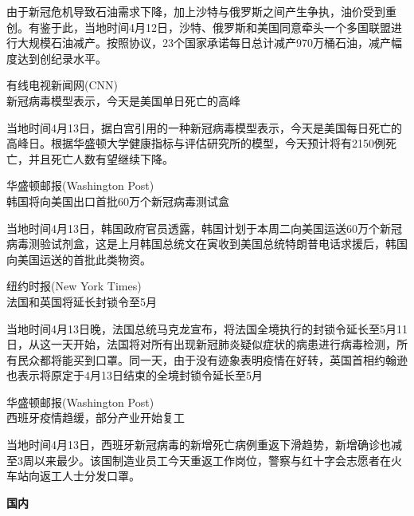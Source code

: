 \documentclass[]{article}
\begin{document}
由于新冠危机导致石油需求下降，加上沙特与俄罗斯之间产生争执，油价受到重创。有鉴于此，当地时间4月12日，沙特、俄罗斯和美国同意牵头一个多国联盟进行大规模石油减产。按照协议，23个国家承诺每日总计减产970万桶石油，减产幅度达到创纪录水平。

\begin{center}
\textcolor{glaucous}{有线电视新闻网(CNN)}\\新冠病毒模型表示，今天是美国单日死亡的高峰
\end{center}

当地时间4月13日，据白宫引用的一种新冠病毒模型表示，今天是美国每日死亡的高峰日。根据华盛顿大学健康指标与评估研究所的模型，今天预计将有2150例死亡，并且死亡人数有望继续下降。

\begin{center}
\textcolor{glaucous}{华盛顿邮报(Washington Post)}\\韩国将向美国出口首批60万个新冠病毒测试盒
\end{center}

当地时间4月13日，韩国政府官员透露，韩国计划于本周二向美国运送60万个新冠病毒测验试剂盒，这是上月韩国总统文在寅收到美国总统特朗普电话求援后，韩国向美国运送的首批此类物资。

\begin{center}
\textcolor{glaucous}{纽约时报(New York Times)}\\法国和英国将延长封锁令至5月
\end{center}

当地时间4月13日晚，法国总统马克龙宣布，将法国全境执行的封锁令延长至5月11日，从这一天开始，法国将对所有出现新冠肺炎疑似症状的病患进行病毒检测，所有民众都将能买到口罩。同一天，由于没有迹象表明疫情在好转，英国首相约翰逊也表示将原定于4月13日结束的全境封锁令延长至5月

\begin{center}
\textcolor{glaucous}{华盛顿邮报(Washington Post)}\\西班牙疫情趋缓，部分产业开始复工
\end{center}

当地时间4月13日，西班牙新冠病毒的新增死亡病例重返下滑趋势，新增确诊也减至3周以来最少。该国制造业员工今天重返工作岗位，警察与红十字会志愿者在火车站向返工人士分发口罩。

\vspace{5mm}

\begin{huge}{\textcolor{glaucous}{\textbf {国内}}}\end{huge}

\vspace{-3mm}
\end{document}
